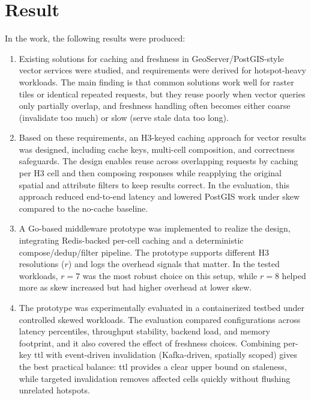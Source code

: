\section{Result}
In the work, the following results were produced:

\begin{enumerate}
  \item Existing solutions for caching and freshness in GeoServer/PostGIS-style vector services were studied, and requirements were derived for hotspot-heavy workloads. The main finding is that common solutions work well for raster tiles or identical repeated requests, but they reuse poorly when vector queries only partially overlap, and freshness handling often becomes either coarse (invalidate too much) or slow (serve stale data too long).

  \item Based on these requirements, an H3-keyed caching approach for vector results was designed, including cache keys, multi-cell composition, and correctness safeguards. The design enables reuse across overlapping requests by caching per H3 cell and then composing responses while reapplying the original spatial and attribute filters to keep results correct. In the evaluation, this approach reduced end-to-end latency and lowered PostGIS work under skew compared to the no-cache baseline.

  \item A Go-based middleware prototype was implemented to realize the design, integrating Redis-backed per-cell caching and a deterministic compose/dedup/filter pipeline. The prototype supports different H3 resolutions ($r$) and logs the overhead signals that matter. In the tested workloads, $r{=}7$ was the most robust choice on this setup, while $r{=}8$ helped more as skew increased but had higher overhead at lower skew.

  \item The prototype was experimentally evaluated in a containerized testbed under controlled skewed workloads. The evaluation compared configurations across latency percentiles, throughput stability, backend load, and memory footprint, and it also covered the effect of freshness choices. Combining per-key \ac{ttl} with event-driven invalidation (Kafka-driven, spatially scoped) gives the best practical balance: \ac{ttl} provides a clear upper bound on staleness, while targeted invalidation removes affected cells quickly without flushing unrelated hotspots.
\end{enumerate}
